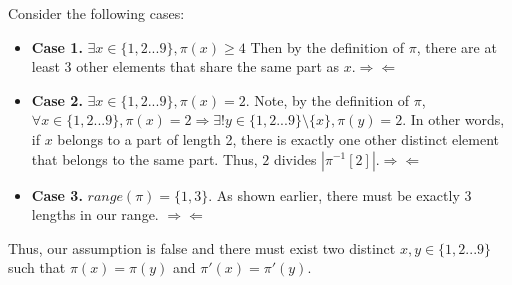 \documentclass{article}
\begin{document}
Consider the following cases:
\begin{itemize}
  \item \textbf{Case 1.} $\exists x \in \{1,2...9\}, \pi(x)\geq 4$
        Then by the definition of $\pi$, there are at least 3 other elements
        that share the same part as $x. \Rightarrow\Leftarrow$
  \item \textbf{Case 2.} $\exists x \in \{1,2...9\}, \pi(x)=2$.
        Note, by the definition of $\pi$, 
        $\forall x \in \{1,2...9\}, \pi(x)=2 \Rightarrow 
         \exists! y \in \{1,2...9\}\setminus \{x\}, \pi(y)=2$.
        In other words, if $x$ belongs to a part of length 2, there is 
        exactly one other distinct element that belongs to the same part.
        Thus, $2$ divides $|\pi^{-1}[2]|. \Rightarrow\Leftarrow$
  \item \textbf{Case 3.} $range(\pi)=\{1,3\}$. As shown earlier,
        there must be exactly 3 lengths in our range. $\Rightarrow\Leftarrow$
\end{itemize}

Thus, our assumption is false and there must exist two distinct 
$x,y \in \{1,2...9\}$ such that $\pi(x)=\pi(y)$ and $\pi'(x)=\pi'(y)$.
\end{document}
